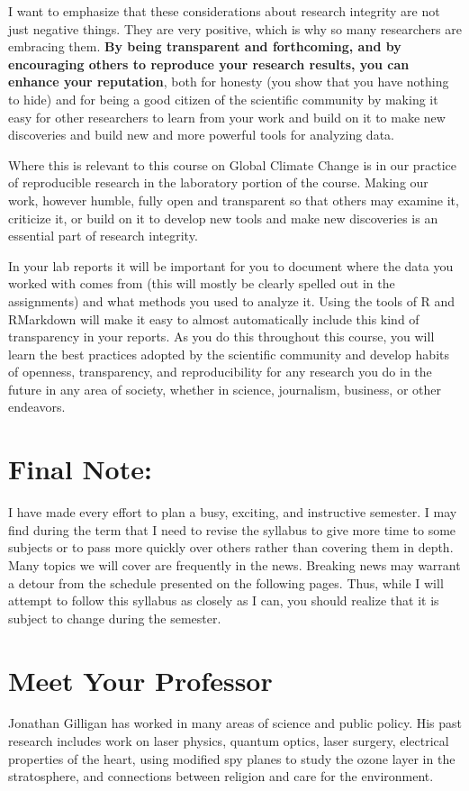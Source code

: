 \documentclass[11pt,twoside]{jgsyllabus}\usepackage[]{graphicx}\usepackage[]{xcolor}
\begin{document}
I want to emphasize that these considerations about research integrity are not
just negative things. They are very positive, which is why so many researchers
are embracing them.
\textbf{By being transparent and forthcoming, and by encouraging
others to reproduce your research results, you can enhance your reputation},
both for honesty (you show that you have nothing to hide) and for being a
good citizen of the scientific community by making it easy for other researchers
to learn from your work and build on it to make new discoveries and build
new and more powerful tools for analyzing data.

Where this is relevant to this course on Global Climate Change is in our
practice of reproducible research in the laboratory portion of the course.
Making our work, however humble, fully open and transparent so that others
may examine it, criticize it, or build on it to develop new tools and make
new discoveries is an essential part of research integrity.

In your lab reports it will be important for you to document where the data you
worked with comes from (this will mostly be clearly spelled out in the
assignments) and what methods you used to analyze it. Using the tools of R and
RMarkdown will make it easy to almost automatically include this kind of
transparency in your reports. As you do this throughout this course, you will
learn the best practices adopted by the scientific community and develop habits
of openness, transparency, and reproducibility for any research you do in the
future in any area of society, whether in science, journalism, business, or
other endeavors.

\section{Final Note:}
I have made every effort to plan a busy, exciting, and instructive semester.
I may find during the term that I need to revise the syllabus to give more time
to some subjects or to pass more quickly over others rather than covering them
in depth. Many topics we will cover are frequently in the news. Breaking news
may warrant a detour from the schedule presented on the following pages.
Thus, while I will attempt to follow this syllabus as closely as I can,
you should realize that it is subject to change during the semester.

\clearpage
\section{Meet Your Professor}
Jonathan Gilligan has worked in many areas of science and public policy.
His past research includes work on laser physics, quantum optics,
laser surgery, electrical properties of the heart, using modified spy planes to
study the ozone layer in the stratosphere, and connections between religion and
care for the environment.
\iffalse
\end{document}
